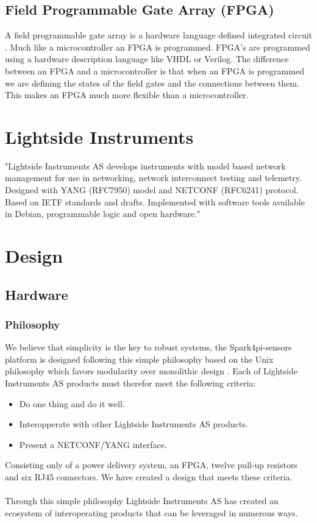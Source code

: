 \documentclass[12pt]{article}
\begin{document}
\subsection{Field Programmable Gate Array (FPGA)}
A field programmable gate array is a hardware language defined integrated circuit \cite{FieldprogrammableGateArray2025}. 
Much like a microcontroller an FPGA is programmed. FPGA's are programmed using a hardware description language like VHDL or Verilog.
The difference between an FPGA and a microcontroller is that when an FPGA is programmed we are defining 
the states of the field gates and the connections between them. This makes an FPGA much more flexible than a microcontroller.

\section{Lightside Instruments}
"Lightside Instruments AS develops instruments with model based network management for use in networking, 
network interconnect testing and telemetry. Designed with YANG (RFC7950) model and NETCONF (RFC6241) protocol. 
Based on IETF standards and drafts. Implemented with software tools available in Debian,
programmable logic and open hardware."

\section{Design}
\subsection{Hardware}
\subsubsection{Philosophy}
We believe that simplicity is the key to robust systems, the Spark4pi-sensors platform is designed following this simple philosophy based on the 
Unix philosophy which favors modularity over monolithic design \cite{BasicsUnixPhilosophy}.
Each of Lightside Instruments AS products must therefor meet the following criteria:
\begin{itemize}
    \item Do one thing and do it well.
    \item Interopperate with other Lightside Instruments AS products.
    \item Present a NETCONF/YANG interface.
\end{itemize}
Consisting only of a power delivery system, an FPGA, twelve pull-up resistors and six RJ45 connectors. We have 
created a design that meets these criteria.
\\
\\
Through this simple philosophy Lightside Instruments AS has created an ecosystem of interoperating products that can be
leveraged in numerous ways.
\end{document}
